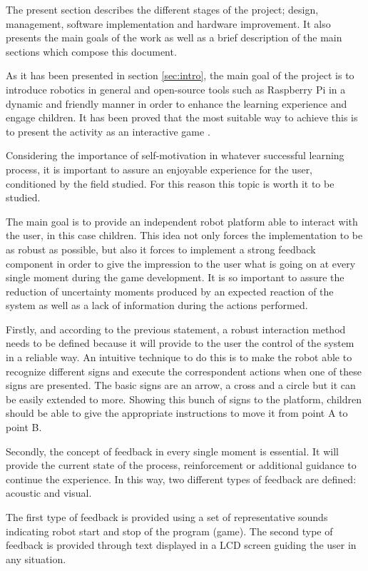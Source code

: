 The present section describes the different stages of the project; design, management, software implementation and hardware improvement. It also presents the main goals of the work as well as a brief description of the main sections which compose this document.

As it has been presented in section \ref{sec:intro}, the main goal of the project is to introduce robotics in general and open-source tools such as Raspberry Pi in a dynamic and friendly manner in order to enhance the learning experience and engage children. It has been proved that the most suitable way to achieve this is to present the activity as an interactive game \cite{bransford1999people}.

Considering the importance of self-motivation in whatever successful learning process, it is important to assure an enjoyable experience for the user, conditioned by the field studied. For this reason this topic is worth it to be studied.

The main goal is to provide an independent robot platform able to interact with the user, in this case children. This idea not only forces the implementation to be as robust as possible, but also it forces to implement a strong feedback component in order to give the impression to the user what is going on at every single moment during the game development. It is so important to assure the reduction of uncertainty moments produced by an expected reaction of the system as well as a lack of information during the actions performed. 

Firstly, and according to the previous statement, a robust interaction method needs to be defined because it will provide to the user the control of the system in a reliable way. An intuitive technique to do this is to make the robot able to recognize different signs and execute the correspondent actions when one of these signs are presented. The basic signs are an arrow, a cross and a circle but it can be easily extended to more. Showing this bunch of signs to the platform, children should be able to give the appropriate instructions to move it from point A to point B.

Secondly, the concept of feedback in every single moment is essential. It will provide the current state of the process, reinforcement or additional guidance to continue the experience. In this way, two different types of feedback are defined: acoustic and visual. 

The first type of feedback is provided using a set of representative sounds indicating robot start and stop of the program (game). The second type of feedback is provided through text displayed in a LCD screen guiding the user in any situation.

